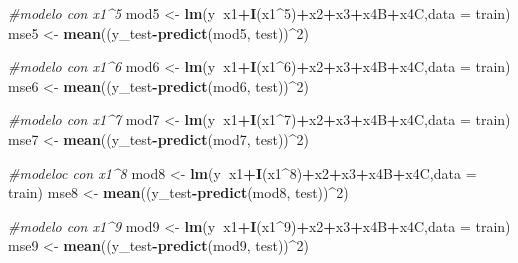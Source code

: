 \documentclass[
]{article}
\newenvironment{Shaded}{\begin{snugshade}}{\end{snugshade}}
\newcommand{\CommentTok}[1]{\textcolor[rgb]{0.56,0.35,0.01}{\textit{#1}}}
\newcommand{\DataTypeTok}[1]{\textcolor[rgb]{0.13,0.29,0.53}{#1}}
\newcommand{\DecValTok}[1]{\textcolor[rgb]{0.00,0.00,0.81}{#1}}
\newcommand{\KeywordTok}[1]{\textcolor[rgb]{0.13,0.29,0.53}{\textbf{#1}}}
\newcommand{\NormalTok}[1]{#1}
\newcommand{\OperatorTok}[1]{\textcolor[rgb]{0.81,0.36,0.00}{\textbf{#1}}}
\newcommand{\StringTok}[1]{\textcolor[rgb]{0.31,0.60,0.02}{#1}}
\begin{document}
\begin{Shaded}
\begin{Highlighting}[]
\CommentTok{#modelo con x1^5}
\NormalTok{mod5 <-}\StringTok{ }\KeywordTok{lm}\NormalTok{(y}\OperatorTok{~}\NormalTok{x1}\OperatorTok{+}\KeywordTok{I}\NormalTok{(x1}\OperatorTok{^}\DecValTok{5}\NormalTok{)}\OperatorTok{+}\NormalTok{x2}\OperatorTok{+}\NormalTok{x3}\OperatorTok{+}\NormalTok{x4B}\OperatorTok{+}\NormalTok{x4C,}\DataTypeTok{data =}\NormalTok{ train)}
\NormalTok{mse5 <-}\StringTok{ }\KeywordTok{mean}\NormalTok{((y_test}\OperatorTok{-}\KeywordTok{predict}\NormalTok{(mod5, test))}\OperatorTok{^}\DecValTok{2}\NormalTok{)}

\CommentTok{#modelo con x1^6}
\NormalTok{mod6 <-}\StringTok{ }\KeywordTok{lm}\NormalTok{(y}\OperatorTok{~}\NormalTok{x1}\OperatorTok{+}\KeywordTok{I}\NormalTok{(x1}\OperatorTok{^}\DecValTok{6}\NormalTok{)}\OperatorTok{+}\NormalTok{x2}\OperatorTok{+}\NormalTok{x3}\OperatorTok{+}\NormalTok{x4B}\OperatorTok{+}\NormalTok{x4C,}\DataTypeTok{data =}\NormalTok{ train)}
\NormalTok{mse6 <-}\StringTok{ }\KeywordTok{mean}\NormalTok{((y_test}\OperatorTok{-}\KeywordTok{predict}\NormalTok{(mod6, test))}\OperatorTok{^}\DecValTok{2}\NormalTok{)}

\CommentTok{#modelo con x1^7}
\NormalTok{mod7 <-}\StringTok{ }\KeywordTok{lm}\NormalTok{(y}\OperatorTok{~}\NormalTok{x1}\OperatorTok{+}\KeywordTok{I}\NormalTok{(x1}\OperatorTok{^}\DecValTok{7}\NormalTok{)}\OperatorTok{+}\NormalTok{x2}\OperatorTok{+}\NormalTok{x3}\OperatorTok{+}\NormalTok{x4B}\OperatorTok{+}\NormalTok{x4C,}\DataTypeTok{data =}\NormalTok{ train)}
\NormalTok{mse7 <-}\StringTok{ }\KeywordTok{mean}\NormalTok{((y_test}\OperatorTok{-}\KeywordTok{predict}\NormalTok{(mod7, test))}\OperatorTok{^}\DecValTok{2}\NormalTok{)}

\CommentTok{#modeloc con x1^8}
\NormalTok{mod8 <-}\StringTok{ }\KeywordTok{lm}\NormalTok{(y}\OperatorTok{~}\NormalTok{x1}\OperatorTok{+}\KeywordTok{I}\NormalTok{(x1}\OperatorTok{^}\DecValTok{8}\NormalTok{)}\OperatorTok{+}\NormalTok{x2}\OperatorTok{+}\NormalTok{x3}\OperatorTok{+}\NormalTok{x4B}\OperatorTok{+}\NormalTok{x4C,}\DataTypeTok{data =}\NormalTok{ train)}
\NormalTok{mse8 <-}\StringTok{ }\KeywordTok{mean}\NormalTok{((y_test}\OperatorTok{-}\KeywordTok{predict}\NormalTok{(mod8, test))}\OperatorTok{^}\DecValTok{2}\NormalTok{)}

\CommentTok{#modelo con x1^9}
\NormalTok{mod9 <-}\StringTok{ }\KeywordTok{lm}\NormalTok{(y}\OperatorTok{~}\NormalTok{x1}\OperatorTok{+}\KeywordTok{I}\NormalTok{(x1}\OperatorTok{^}\DecValTok{9}\NormalTok{)}\OperatorTok{+}\NormalTok{x2}\OperatorTok{+}\NormalTok{x3}\OperatorTok{+}\NormalTok{x4B}\OperatorTok{+}\NormalTok{x4C,}\DataTypeTok{data =}\NormalTok{ train)}
\NormalTok{mse9 <-}\StringTok{ }\KeywordTok{mean}\NormalTok{((y_test}\OperatorTok{-}\KeywordTok{predict}\NormalTok{(mod9, test))}\OperatorTok{^}\DecValTok{2}\NormalTok{)}


\end{Highlighting}
\end{Shaded}
\end{document}
